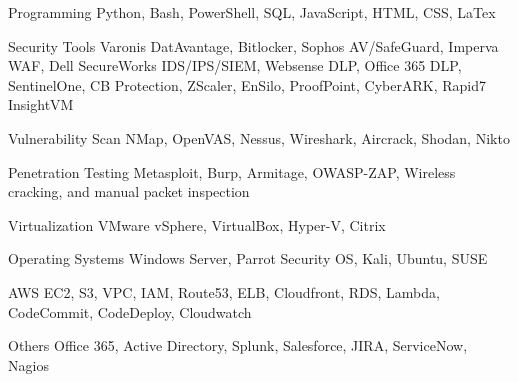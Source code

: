 
\begin{cvskills}
  \cvskill
    {Programming} %
    {Python, Bash, PowerShell, SQL, JavaScript, HTML, CSS, LaTex} %

  \cvskill
    {Security Tools} %
    {Varonis DatAvantage, Bitlocker, Sophos AV/SafeGuard, Imperva WAF, Dell SecureWorks IDS/IPS/SIEM, Websense DLP,\newline
    Office 365 DLP, SentinelOne, CB Protection, ZScaler, EnSilo, ProofPoint, CyberARK, Rapid7 InsightVM} %

  \cvskill
     {Vulnerability Scan} %
     {NMap, OpenVAS, Nessus, Wireshark, Aircrack, Shodan, Nikto} %
 
  \cvskill
     {Penetration Testing} %
     {Metasploit, Burp, Armitage, OWASP-ZAP, Wireless cracking, and manual packet inspection} %
 
  \cvskill
    {Virtualization} %
    {VMware vSphere, VirtualBox, Hyper-V, Citrix} %

  \cvskill
    {Operating Systems} %
    {Windows Server, Parrot Security OS, Kali, Ubuntu, SUSE} %

  \cvskill
    {AWS} %
    {EC2, S3, VPC, IAM, Route53, ELB, Cloudfront, RDS, Lambda, CodeCommit, CodeDeploy, Cloudwatch} %

  \cvskill
    {Others} %
    {Office 365, Active Directory, Splunk, Salesforce, JIRA, ServiceNow, Nagios} %

\end{cvskills}
